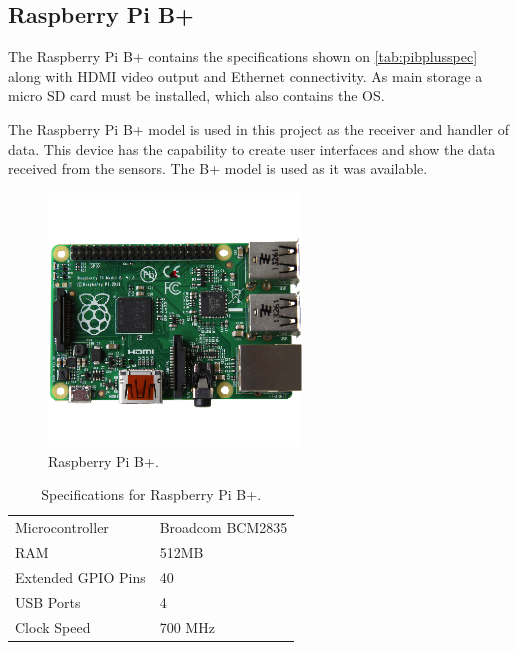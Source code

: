 \subsection{Raspberry Pi B+}
The Raspberry Pi B+ contains the specifications shown on \ref{tab:pibplusspec} along with HDMI video output and Ethernet connectivity. As main storage a micro SD card must be installed, which also contains the OS.

The Raspberry Pi B+ model is used in this project as the receiver and handler of data. This device has the capability to create user interfaces and show the data received from the sensors. The B+ model is used as it was available.

\begin{figure}[h!]
\centering
\includegraphics[width=0.6\textwidth]{chapters/analysis/figs/raspberry-pi-model-b-plus.png}
\caption{Raspberry Pi B+\cite{pibplus}.}
\label{fig:pibplus}
\end{figure}

\begin{table}[h!]
\centering
\begin{tabular}{| l | l |}
\hline
Microcontroller & Broadcom BCM2835\\
RAM & 512MB\\
Extended GPIO Pins & 40\\
USB Ports & 4\\
Clock Speed & 700 MHz\\
\hline
\end{tabular}
\caption{Specifications for Raspberry Pi B+\cite{pispecs}.}
\end{table}
\label{tab:pibplusspec}
